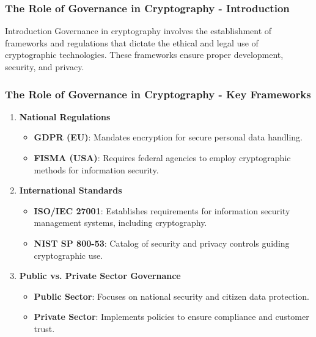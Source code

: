\documentclass{beamer}
\begin{document}
\begin{frame}[fragile]
    \frametitle{The Role of Governance in Cryptography - Introduction}
    \begin{block}{Introduction}
        Governance in cryptography involves the establishment of frameworks and regulations that dictate the ethical and legal use of cryptographic technologies. These frameworks ensure proper development, security, and privacy.
    \end{block}
\end{frame}

\begin{frame}[fragile]
    \frametitle{The Role of Governance in Cryptography - Key Frameworks}
    \begin{enumerate}
        \item \textbf{National Regulations}
            \begin{itemize}
                \item \textbf{GDPR (EU)}: Mandates encryption for secure personal data handling.
                \item \textbf{FISMA (USA)}: Requires federal agencies to employ cryptographic methods for information security.
            \end{itemize}

        \item \textbf{International Standards}
            \begin{itemize}
                \item \textbf{ISO/IEC 27001}: Establishes requirements for information security management systems, including cryptography.
                \item \textbf{NIST SP 800-53}: Catalog of security and privacy controls guiding cryptographic use.
            \end{itemize}

        \item \textbf{Public vs. Private Sector Governance}
            \begin{itemize}
                \item \textbf{Public Sector}: Focuses on national security and citizen data protection.
                \item \textbf{Private Sector}: Implements policies to ensure compliance and customer trust.
            \end{itemize}
    \end{enumerate}
\end{frame}
\end{document}

